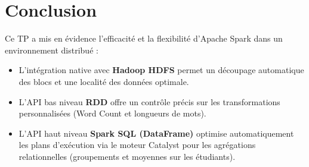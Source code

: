 \documentclass[11pt,a4paper]{article}
\begin{document}
\section{Conclusion}

Ce TP a mis en évidence l'efficacité et la flexibilité d'Apache Spark dans un environnement distribué :
\begin{itemize}
    \item L'intégration native avec \textbf{Hadoop HDFS} permet un découpage automatique des blocs et une localité des données optimale.
    \item L'API bas niveau \textbf{RDD} offre un contrôle précis sur les transformations personnalisées (Word Count et longueurs de mots).
    \item L'API haut niveau \textbf{Spark SQL (DataFrame)} optimise automatiquement les plans d'exécution via le moteur Catalyst pour les agrégations relationnelles (groupements et moyennes sur les étudiants).
\end{itemize}
\end{document}
